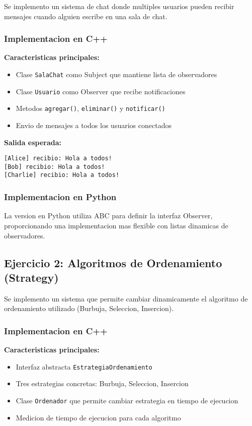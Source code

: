 \documentclass[11pt,a4paper]{article}
\begin{document}
Se implemento un sistema de chat donde multiples usuarios pueden recibir mensajes cuando alguien escribe en una sala de chat.

\subsubsection{Implementacion en C++}

\textbf{Caracteristicas principales:}
\begin{itemize}
    \item Clase \texttt{SalaChat} como Subject que mantiene lista de observadores
    \item Clase \texttt{Usuario} como Observer que recibe notificaciones
    \item Metodos \texttt{agregar()}, \texttt{eliminar()} y \texttt{notificar()}
    \item Envio de mensajes a todos los usuarios conectados
\end{itemize}

\textbf{Salida esperada:}
\begin{verbatim}
[Alice] recibio: Hola a todos!
[Bob] recibio: Hola a todos!
[Charlie] recibio: Hola a todos!
\end{verbatim}

\subsubsection{Implementacion en Python}

La version en Python utiliza ABC para definir la interfaz Observer, proporcionando una implementacion mas flexible con listas dinamicas de observadores.

\subsection{Ejercicio 2: Algoritmos de Ordenamiento (Strategy)}

Se implemento un sistema que permite cambiar dinamicamente el algoritmo de ordenamiento utilizado (Burbuja, Seleccion, Insercion).

\subsubsection{Implementacion en C++}

\textbf{Caracteristicas principales:}
\begin{itemize}
    \item Interfaz abstracta \texttt{EstrategiaOrdenamiento}
    \item Tres estrategias concretas: Burbuja, Seleccion, Insercion
    \item Clase \texttt{Ordenador} que permite cambiar estrategia en tiempo de ejecucion
    \item Medicion de tiempo de ejecucion para cada algoritmo
\end{itemize}
\end{document}
